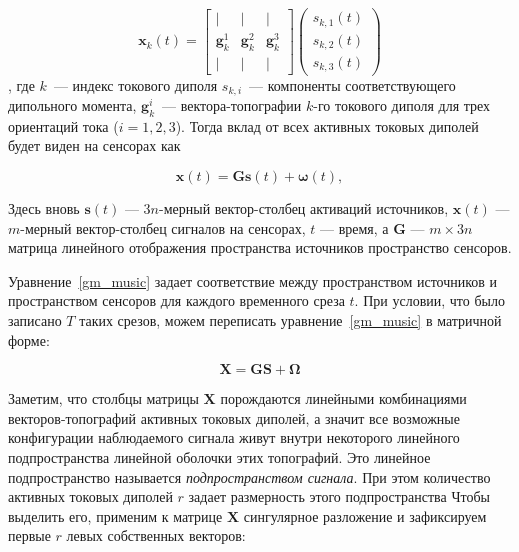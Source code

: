 \begin{equation}
    \mathbf{x}_k(t) =
        \begin{bmatrix}
            |                 & |              & |              \\
            \mathbf{g}_k^1    & \mathbf{g}_k^2 & \mathbf{g}_k^3 \\
            |                 & |              & |
        \end{bmatrix}
        \left(\begin{array}{ccc}
                s_{k,1}(t)\\
                s_{k,2}(t)\\
                s_{k,3}(t)
            \end{array}
        \right)
\end{equation},
где $k$~--- индекс токового диполя $s_{k,i}$~--- компоненты соответствующего
дипольного момента,
$\mathbf{g}_k^i$~--- вектора-топографии $k$-го токового диполя
для трех ориентаций тока ($i=1,2,3$).
Тогда вклад от всех активных токовых диполей будет виден на сенсорах как

\begin{equation}
    \mathbf{x}(t) = \mathbf{G} \mathbf{s}(t) + \mathbf{\omega}(t),
    \label{gm_music}
\end{equation}

Здесь вновь $\mathbf{s}(t)$ --- $3n$-мерный вектор-столбец активаций источников,
$\mathbf{x}(t)$ --- $m$-мерный вектор-столбец сигналов на сенсорах,
$t$ --- время, а $\mathbf{G}$ --- $m \times 3n$ матрица линейного
отображения пространства источников пространство сенсоров.

Уравнение~\ref{gm_music} задает соответствие между пространством источников и пространством
сенсоров для каждого временного среза $t$.
При условии, что было записано $T$ таких срезов,
можем переписать уравнение~\ref{gm_music} в матричной форме:

\begin{equation}
    \mathbf{X} = \mathbf{G} \mathbf{S} + \mathbf{\Omega}
    \label{gm_music_matrix}
\end{equation}

Заметим, что столбцы матрицы $\mathbf{X}$ порождаются линейными комбинациями
векторов-топографий активных токовых диполей, а значит все возможные конфигурации
наблюдаемого сигнала живут внутри некоторого линейного подпространства линейной оболочки этих
топографий. Это линейное подпространство называется \emph{подпространством сигнала}.
При этом количество активных токовых диполей $r$ задает размерность этого подпространства
Чтобы выделить его, применим к матрице $\mathbf{X}$
сингулярное разложение и зафиксируем первые $r$ левых собственных векторов:

